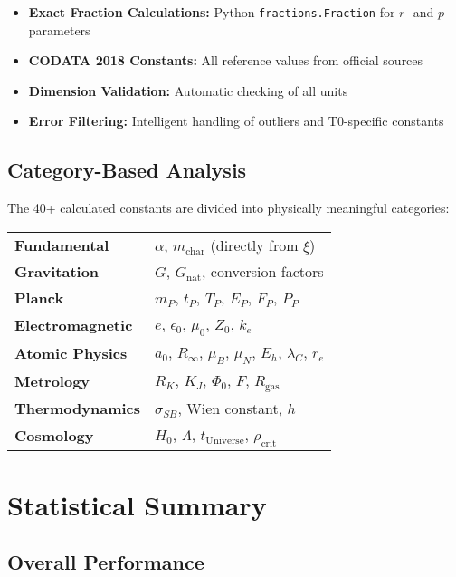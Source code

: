 \documentclass[11pt,a4paper]{article}
\begin{document}
	\begin{itemize}
		\item \textbf{Exact Fraction Calculations:} Python \texttt{fractions.Fraction} for $r$- and $p$-parameters
		\item \textbf{CODATA 2018 Constants:} All reference values from official sources
		\item \textbf{Dimension Validation:} Automatic checking of all units
		\item \textbf{Error Filtering:} Intelligent handling of outliers and T0-specific constants
	\end{itemize}
	
	\subsection{Category-Based Analysis}
	
	The 40+ calculated constants are divided into physically meaningful categories:
	
	\begin{center}
		\begin{tabular}{ll}
			\textbf{Fundamental} & $\alpha$, $m_{\text{char}}$ (directly from $\xi$) \\
			\textbf{Gravitation} & $G$, $G_{\text{nat}}$, conversion factors \\
			\textbf{Planck} & $m_P$, $t_P$, $T_P$, $E_P$, $F_P$, $P_P$ \\
			\textbf{Electromagnetic} & $e$, $\epsilon_0$, $\mu_0$, $Z_0$, $k_e$ \\
			\textbf{Atomic Physics} & $a_0$, $R_\infty$, $\mu_B$, $\mu_N$, $E_h$, $\lambda_C$, $r_e$ \\
			\textbf{Metrology} & $R_K$, $K_J$, $\Phi_0$, $F$, $R_{\text{gas}}$ \\
			\textbf{Thermodynamics} & $\sigma_{SB}$, Wien constant, $h$ \\
			\textbf{Cosmology} & $H_0$, $\Lambda$, $t_{\text{Universe}}$, $\rho_{\text{crit}}$ \\
		\end{tabular}
	\end{center}
	
	\section{Statistical Summary}
	
	\subsection{Overall Performance}
	
\end{document}
